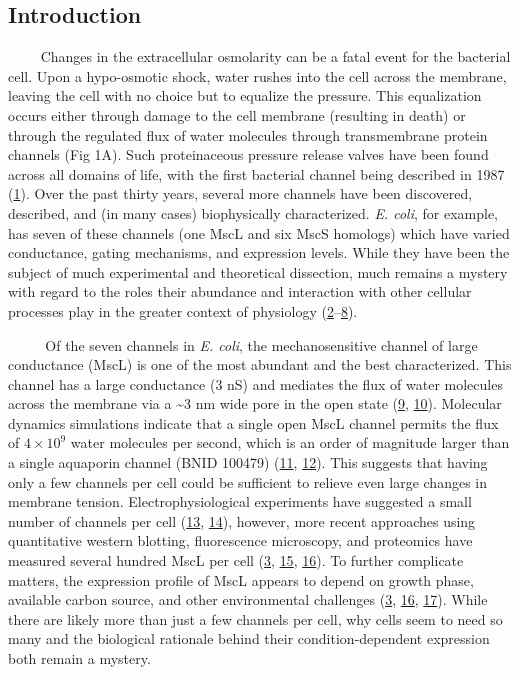 \subsection{Introduction}\label{introduction}

~~~~
Changes
in the
extracellular
osmolarity
can be
a
fatal
event
for
the
bacterial
cell.
Upon a
hypo-osmotic
shock,
water
rushes
into
the
cell
across
the
membrane,
leaving
the
cell
with
no
choice
but to
equalize
the
pressure.
This
equalization
occurs
either
through
damage
to the
cell
membrane
(resulting
in
death)
or
through
the
regulated
flux
of
water
molecules
through
transmembrane
protein
channels
(Fig
1A).
Such
proteinaceous
pressure
release
valves
have
been
found
across
all
domains
of
life,
with
the
first
bacterial
channel
being
described
in
1987
(\protect\hyperlink{ref-martinac1987}{1}).
Over
the
past
thirty
years,
several
more
channels
have
been
discovered,
described,
and
(in
many
cases)
biophysically
characterized.
\emph{E.
coli},
for
example,
has
seven
of
these
channels
(one
MscL
and
six
MscS
homologs)
which
have
varied
conductance,
gating
mechanisms,
and
expression
levels.
While
they
have
been
the
subject
of
much
experimental
and
theoretical
dissection,
much
remains
a
mystery
with
regard
to the
roles
their
abundance
and
interaction
with
other
cellular
processes
play
in the
greater
context
of
physiology
(\protect\hyperlink{ref-bavi2016}{2}--\protect\hyperlink{ref-vandenberg2016}{8}).

~~ ~
~Of
the
seven
channels
in
\emph{E.
coli},
the
mechanosensitive
channel
of
large
conductance
(MscL)
is one
of the
most
abundant
and
the
best
characterized.
This
channel
has a
large
conductance
(3 nS)
and
mediates
the
flux
of
water
molecules
across
the
membrane
via a
\textasciitilde{}3
nm
wide
pore
in the
open
state
(\protect\hyperlink{ref-cruickshank1997}{9},
\protect\hyperlink{ref-haswell2011}{10}).
Molecular
dynamics
simulations
indicate
that a
single
open
MscL
channel
permits
the
flux
of
\(4 \times 10^9\)
water
molecules
per
second,
which
is an
order
of
magnitude
larger
than a
single
aquaporin
channel
(BNID
100479)
(\protect\hyperlink{ref-louhivuori2010}{11},
\protect\hyperlink{ref-milo2010}{12}).
This
suggests
that
having
only a
few
channels
per
cell
could
be
sufficient
to
relieve
even
large
changes
in
membrane
tension.
Electrophysiological
experiments
have
suggested
a
small
number
of
channels
per
cell
(\protect\hyperlink{ref-booth2005}{13},
\protect\hyperlink{ref-hase1997}{14}),
however,
more
recent
approaches
using
quantitative
western
blotting,
fluorescence
microscopy,
and
proteomics
have
measured
several
hundred
MscL
per
cell
(\protect\hyperlink{ref-bialecka-fornal2012}{3},
\protect\hyperlink{ref-schmidt2016}{15},
\protect\hyperlink{ref-soufi2015}{16}).
To
further
complicate
matters,
the
expression
profile
of
MscL
appears
to
depend
on
growth
phase,
available
carbon
source,
and
other
environmental
challenges
(\protect\hyperlink{ref-bialecka-fornal2012}{3},
\protect\hyperlink{ref-soufi2015}{16},
\protect\hyperlink{ref-stokes2003a}{17}).
While
there
are
likely
more
than
just a
few
channels
per
cell,
why
cells
seem
to
need
so
many
and
the
biological
rationale
behind
their
condition-dependent
expression
both
remain
a
mystery.

